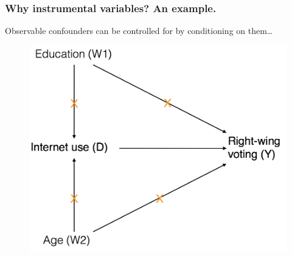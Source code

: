 \documentclass[12pt,english,dvipsnames,aspectratio=169,handout]{beamer}\usepackage[]{graphicx}\usepackage[]{xcolor}
\begin{document}
\begin{frame}
  \frametitle{Why instrumental variables? An example.}
  Observable confounders can be controlled for by conditioning on them\ldots
	 \begin{figure} 
    \includegraphics[height=.45\textheight,keepaspectratio=true]{../04-figures/05/03-w5_dag_3.png}
    \end{figure}
\vspace{3cm}
\end{frame}
\end{document}
